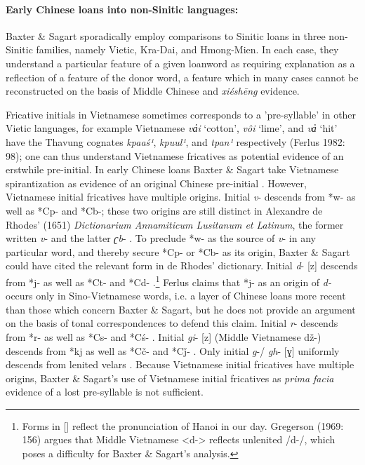 \paragraph{Early Chinese loans into
non-Sinitic languages:} Baxter \& Sagart sporadically employ
comparisons to Sinitic loans in three non-Sinitic families, namely
Vietic, Kra-Dai, and Hmong-Mien. In each case, they understand a
particular feature of a given loanword as requiring explanation as a
reflection of a feature of the donor word, a feature which in many cases
cannot be reconstructed on the basis of Middle Chinese and
 \emph{xiéshēng} evidence.

Fricative initials in Vietnamese sometimes corresponds to a
'pre-syllable' in other Vietic languages, for example Vietnamese
 \emph{va̓i} `cotton',  \emph{vôi} `lime', and \emph{va̓} `hit' have the
Thavung cognates \emph{kpaaś¹}, \emph{ kpuul¹}, and \emph{tpan¹}
respectively (Ferlus 1982: 98); one can thus understand Vietnamese
fricatives as potential evidence of an erstwhile pre-initial. In early
Chinese loans Baxter \& Sagart take Vietnamese spirantization as
evidence of an original Chinese pre-initial 
\citeyearpar[47]{Baxter2014OldChinese}. However,
Vietnamese initial fricatives have multiple origins. Initial \emph{v}-
descends from *w- as well as *Cp- and *Cb-; these two origins are still
distinct in Alexandre de Rhodes' (1651)  \emph{Dictionarium Annamiticum
Lusitanum et Latinum}, the former written  \emph{v}- and the latter
 \emph{ʗb}- 
 \citep[89-90]{Ferlus1982}. To preclude *w- as the source of
 \emph{v}- in any particular word, and thereby secure *Cp- or *Cb- as its
origin, Baxter \& Sagart could have cited the relevant form in de
Rhodes' dictionary. Initial \emph{d}- {[}z] descends from *j- as well
as *Ct- and *Cd- \citep[90]{Ferlus1982}.\footnote{Forms in {[}] reflect the
  pronunciation of Hanoi in our day. 
  \citet[]{Gregerson1969}
  Gregerson (1969: 156) argues that
  Middle Vietnamese \textless{}d-\textgreater{} reflects unlenited /d-/,
  which poses a difficulty for Baxter \& Sagart's analysis. } Ferlus
claims that *j- as an origin of \emph{d- }occurs only in Sino-Vietnamese
words, i.e. a layer of Chinese loans more recent than those which
concern Baxter \& Sagart, but he does not provide an argument on the
basis of tonal correspondences to defend this claim. Initial \emph{r}-
descends from *r- as well as *Cs- and *Cś- 
\citep[91-93]{Ferlus1982}.
Initial
 \emph{gi}- {[}z] (Middle Vietnamese dž-) descends from *kj as well as
*Cč- and *Cǰ- 
\citep[93, 102]{Ferlus1982}.
Only initial \emph{g}-/ \emph{gh}-
{[}ɣ] uniformly descends from lenited velars 
\citep[91, 99-100]{Ferlus1982}.
Because Vietnamese initial fricatives have multiple origins,
Baxter \& Sagart's use of Vietnamese initial fricatives as \emph{prima
facia} evidence of a lost pre-syllable is not sufficient.

